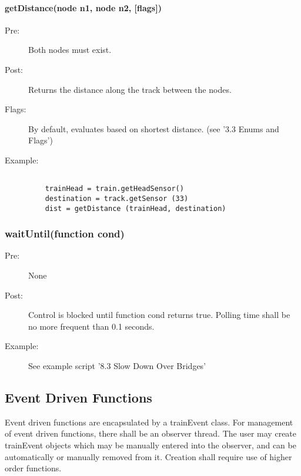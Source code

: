 \documentclass[a4paper,11pt,notitlepage]{article}
\begin{document}
\paragraph{getDistance(node n1, node n2, [flags])}
\begin{description}
\item[\hspace{1cm}Pre:] Both nodes must exist.
\item[\hspace{1cm}Post:] Returns the distance along the track between the nodes.
\item[\hspace{1cm}Flags:] By default, evaluates based on shortest distance. (see '3.3 Enums and Flags')
\item[\hspace{1cm}Example:]
\begin{verbatim}

    trainHead = train.getHeadSensor()
    destination = track.getSensor (33)
    dist = getDistance (trainHead, destination)
\end{verbatim}
\end{description}


\subsubsection{waitUntil(function cond)}
\begin{description}
\item[\hspace{1cm}Pre:] None
\item[\hspace{1cm}Post:] Control is blocked until function cond returns true. Polling time shall be no more frequent than 0.1 seconds.
\item[\hspace{1cm}Example:] See example script '8.3 Slow Down Over Bridges'
\end{description}

\subsection{Event Driven Functions}
Event driven functions are encapsulated by a trainEvent class. For management of event driven functions, there shall be an observer thread. The user may create trainEvent objects which may be manually entered into the observer, and can be automatically or manually removed from it. Creation shall require use of higher order functions.
\end{document}

